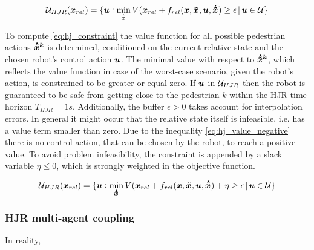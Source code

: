 \begin{equation}
\uset_{HJR} (\xrel) = \{ \u: \min_{\dxped[]} \Vrel(\x_{rel} + \frel(\x, \xped[], \u, \dxped[]) \geq \epsilon  \, | \, \u \in \uset \}
\label{eq:hj_constraint}
\end{equation}

To compute \ref{eq:hj_constraint} the value function for all possible pedestrian actions $\dxped[k]$ is determined, conditioned on the current relative state and the chosen robot's control action $\boldsymbol{u}$. The minimal value with respect to $\dxped[k]$, which reflects the value function in case of the worst-case scenario, given the robot's action, is constrained to be greater or equal zero. If $\boldsymbol{u}$ in $\mathcal{U}_{HJR}$ then the robot is guaranteed to be safe from getting close to the pedestrian $k$ within the \ac{HJR}-time-horizon $T_{HJR} = 1s$. Additionally, the buffer $\epsilon > 0$ takes account for interpolation errors. 
\newline
In general it might occur that the relative state itself is infeasible, i.e. has a value term smaller than zero. Due to the inequality \ref{eq:hj_value_negative} there is no control action, that can be chosen by the robot, to reach a positive value. To avoid problem infeasibility, the constraint is appended by a slack variable $\eta \leq 0$, which is strongly weighted in the objective function. 

\begin{equation}
\uset_{HJR} (\xrel) = \{ \u: \min_{\dxped[]} \Vrel(\x_{rel} + \frel(\x, \xped[], \u, \dxped[]) + \eta \geq \epsilon  \, | \, \u \in \uset \}
\end{equation}

\subsubsection{\ac{HJR} multi-agent coupling}
In reality, 

